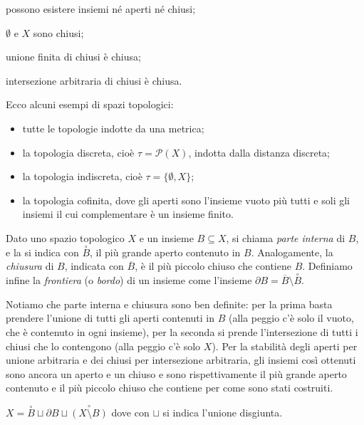 \documentclass{article}
\begin{document}
\begin{oss}
\begin{nlist}
\item possono esistere insiemi né aperti né chiusi;
\item $\emptyset$ e $X$ sono chiusi;
\item unione finita di chiusi è chiusa;
\item intersezione arbitraria di chiusi è chiusa.
\end{nlist}
\end{oss}

\begin{ex}
Ecco alcuni esempi di spazi topologici:
\begin{itemize}
\item tutte le topologie indotte da una metrica;
\item la topologia discreta, cioè $\tau=\mathcal{P}(X)$, indotta dalla distanza
discreta;
\item la topologia indiscreta, cioè $\tau=\{ \emptyset, X \}$;
\item la topologia cofinita, dove gli aperti sono l'insieme vuoto più tutti e
soli gli insiemi il cui complementare è un insieme finito.
\end{itemize}
\end{ex}

\begin{defn}
	Dato uno spazio topologico $X$ e un insieme $B \subseteq X$, si chiama \textit{parte interna} di $B$, e la si indica con $\stackrel{\circ}{B}$, il più grande aperto contenuto in $B$. Analogamente, la \textit{chiusura} di $B$, indicata con $\overline{B}$, è il più piccolo chiuso che contiene $B$. Definiamo infine la \textit{frontiera} (o \textit{bordo}) di un insieme come l'insieme $\partial B= \overline{B} \setminus \stackrel{\circ}{B}$.
\end{defn}

Notiamo che parte interna e chiusura sono ben definite: per la prima basta prendere l'unione di tutti gli aperti contenuti in $B$ (alla peggio c'è solo il vuoto, che è contenuto in ogni insieme), per la seconda si prende l'intersezione di tutti i chiusi che lo contengono (alla peggio c'è solo $X$). Per la stabilità degli aperti per unione arbitraria e dei chiusi per intersezione arbitraria, gli insiemi così ottenuti sono ancora un aperto e un chiuso e sono rispettivamente il più grande aperto contenuto e il più piccolo chiuso che contiene per come sono stati costruiti.

\begin{ftt}
	$X= \stackrel{\circ}{B} \sqcup \partial B \sqcup \stackrel{\circ}{(X \setminus B)}$ dove con $\sqcup$ si indica l'unione disgiunta.
\end{ftt}
\end{document}
